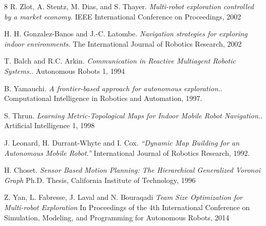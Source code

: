 \documentclass[runningheads]{llncs}
\begin{document}
\begin{thebibliography}{8}
R. Zlot, A. Stentz, M. Dias, and S. Thayer.
\textit{Multi-robot exploration	controlled by a market economy}.
IEEE International Conference on Proceedings, 2002

H. H. Gonzalez-Banos and J.-C. Latombe.
\textit{Navigation strategies for exploring indoor environments}.
The International Journal of Robotics Research, 2002

T. Balch and R.C. Arkin.
\textit{Communication in Reactive Multiagent Robotic Systems.}.
Autonomous Robots 1, 1994

B. Yamauchi.
\textit{A frontier-based approach for autonomous exploration.}.
Computational Intelligence in Robotics and Automation, 1997.

S. Thrun.
\textit{Learning Metric-Topological Maps for Indoor	Mobile Robot Navigation.}.
Artificial Intelligence 1, 1998

J. Leonard, H. Durrant-Whyte and I. Cox. 
\textit{“Dynamic Map Building for an Autonomous Mobile Robot.”}
International Journal of Robotics Research, 1992.

H. Choset.
\textit{Sensor Based Motion Planning: The Hierarchical Generalized Voronoi Graph}
Ph.D. Thesis, California Institute of Technology, 1996

Z. Yan, L. Fabresse, J. Laval and N. Bouraqadi
\textit{Team Size Optimization for Multi-robot Exploration}
In Proceedings of the 4th International Conference on Simulation, Modeling, and Programming for Autonomous Robots, 2014
\end{thebibliography}
\end{document}
